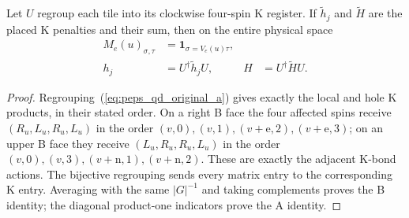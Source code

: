 \begin{theorem}
    \label{thm:peps_qd_original_blocking}
    \leanok
    Let $U$ regroup each tile into its clockwise four-spin K register.
    If $\widetilde h_j$ and $\widetilde H$ are the placed K penalties and
    their sum, then on the entire physical space
    \begin{align}
        M_e(u)_{\sigma,\tau}
          &=\mathbf1_{\sigma=V_e(u)\tau},\\
        h_j&=U^\dagger\widetilde h_jU,&
        H&=U^\dagger\widetilde HU.
        \label{eq:peps_qd_original_blocking}
    \end{align}
\end{theorem}
\begin{proof}\leanok
    Regrouping~(\ref{eq:peps_qd_original_a}) gives exactly the local and
    hole K products, in their stated order. On a right B face the four
    affected spins receive $(R_u,L_u,R_u,L_u)$ in the order
    $(v,0),(v,1),(v+\mathrm e,2),(v+\mathrm e,3)$; on an upper B face
    they receive $(L_u,R_u,R_u,L_u)$ in the order
    $(v,0),(v,3),(v+\mathrm n,1),(v+\mathrm n,2)$.
    These are exactly the adjacent K-bond actions.
    The bijective regrouping sends every matrix entry to the corresponding
    K entry. Averaging with the same $|G|^{-1}$ and taking complements proves
    the B identity; the diagonal product-one indicators prove the A identity.
\end{proof}

